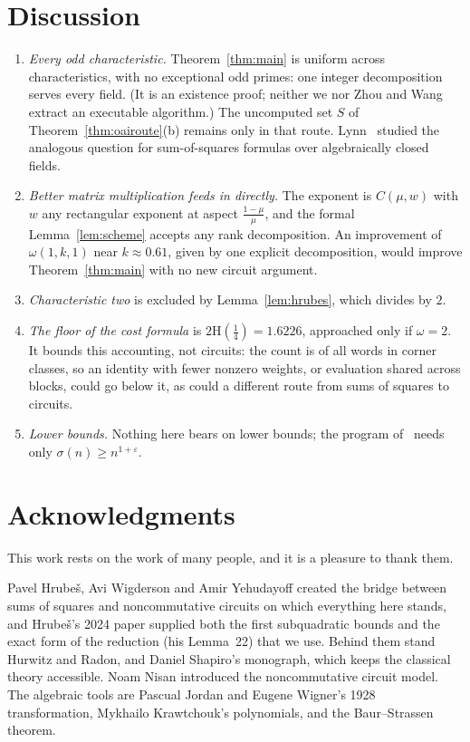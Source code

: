 \documentclass[11pt]{article}
\theoremstyle{definition}
\theoremstyle{remark}
\newcommand{\Hb}{\mathrm{H}}
\begin{document}
\section{Discussion}
\begin{enumerate}[label=(\arabic*)]
\item \emph{Every odd characteristic.} Theorem~\ref{thm:main} is uniform across characteristics, with no exceptional
odd primes: one integer decomposition serves every field. (It is an existence proof; neither we nor Zhou and Wang
extract an executable algorithm.) The uncomputed set $S$ of Theorem~\ref{thm:oairoute}(b) remains only in that
route. Lynn~\cite{Lynn2015} studied the analogous question for sum-of-squares formulas over
algebraically closed fields.
\item \emph{Better matrix multiplication feeds in directly.} The exponent is $C(\mu,w)$ with $w$ any rectangular
exponent at aspect $\frac{1-\mu}{\mu}$, and the formal Lemma~\ref{lem:scheme} accepts any rank decomposition. An
improvement of $\omega(1,k,1)$ near $k\approx0.61$, given by one explicit decomposition, would improve
Theorem~\ref{thm:main} with no new circuit argument.
\item \emph{Characteristic two} is excluded by Lemma~\ref{lem:hrubes}, which divides by $2$.
\item \emph{The floor of the cost formula} is $2\Hb(\frac14)=1.6226$, approached only if $\omega=2$. It bounds this
accounting, not circuits: the count is of all words in corner classes, so an identity with fewer nonzero weights, or
evaluation shared across blocks, could go below it, as could a different route from sums of squares to circuits.
\item \emph{Lower bounds.} Nothing here bears on lower bounds; the program of~\cite{HWY2011} needs only
$\sigma(n)\ge n^{1+\varepsilon}$.
\end{enumerate}

\section*{Acknowledgments}
This work rests on the work of many people, and it is a pleasure to thank them.

Pavel Hrube\v{s}, Avi Wigderson and Amir Yehudayoff created the bridge between sums of squares and noncommutative
circuits on which everything here stands, and Hrube\v{s}'s 2024 paper supplied both the first subquadratic bounds
and the exact form of the reduction (his Lemma~22) that we use. Behind them stand Hurwitz and Radon, and Daniel
Shapiro's monograph, which keeps the classical theory accessible. Noam Nisan introduced the noncommutative circuit
model. The algebraic tools are Pascual Jordan and Eugene Wigner's 1928 transformation, Mykhailo Krawtchouk's
polynomials, and the Baur--Strassen theorem.
\end{document}
